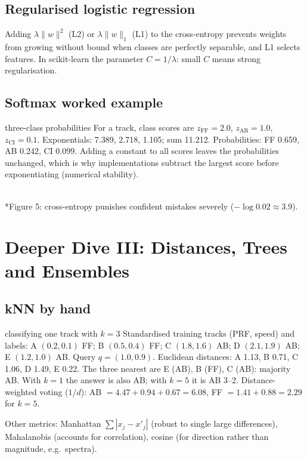 \documentclass[11pt]{article}
\begin{document}
\subsection{Regularised logistic regression}
Adding $\lambda\|w\|^2$ (L2) or $\lambda\|w\|_1$ (L1) to the cross-entropy prevents weights from growing without bound when classes are perfectly separable, and L1 selects features. In scikit-learn the parameter $C=1/\lambda$: small $C$ means strong regularisation.

\subsection{Softmax worked example}
\begin{example}{three-class probabilities}
For a track, class scores are $z_{\text{FF}}=2.0$, $z_{\text{AB}}=1.0$, $z_{\text{CI}}=0.1$. Exponentials: 7.389, 2.718, 1.105; sum 11.212. Probabilities: FF 0.659, AB 0.242, CI 0.099. Adding a constant to all scores leaves the probabilities unchanged, which is why implementations subtract the largest score before exponentiating (numerical stability).
\end{example}

\begin{center}\\*{\small\color{GreyN}Figure 5: cross-entropy punishes confident mistakes severely ($-\log0.02\approx3.9$).}\end{center}

\section{Deeper Dive III: Distances, Trees and Ensembles}
\subsection{kNN by hand}
\begin{example}{classifying one track with $k=3$}
Standardised training tracks (PRF, speed) and labels: A $(0.2,0.1)$ FF; B $(0.5,0.4)$ FF; C $(1.8,1.6)$ AB; D $(2.1,1.9)$ AB; E $(1.2,1.0)$ AB. Query $q=(1.0,0.9)$. Euclidean distances: A 1.13, B 0.71, C 1.06, D 1.49, E 0.22. The three nearest are E (AB), B (FF), C (AB): majority AB. With $k=1$ the answer is also AB; with $k=5$ it is AB 3--2. Distance-weighted voting ($1/d$): AB $=4.47+0.94+0.67=6.08$, FF $=1.41+0.88=2.29$ for $k=5$.
\end{example}
Other metrics: Manhattan $\sum|x_j-x'_j|$ (robust to single large differences), Mahalanobis (accounts for correlation), cosine (for direction rather than magnitude, e.g.\ spectra).
\end{document}
